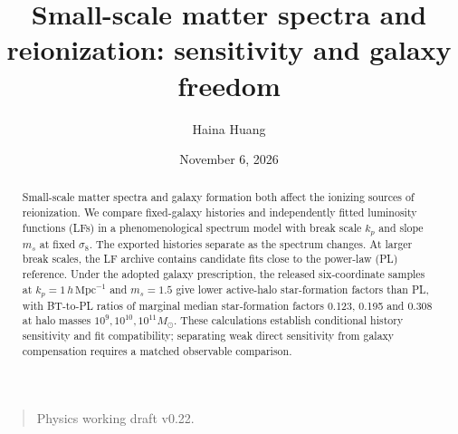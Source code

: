 \documentclass[reprint,superscriptaddress,nofootinbib,nobibnotes,amsmath,amssymb,aps,prd,floatfix,longbibliography]{revtex4-2}
\def\btemubody{body.tex}
\begin{document}
\title{Small-scale matter spectra and reionization: sensitivity and galaxy freedom}
\author{Haina Huang}
\date{November 6, 2026}
\begin{abstract}
Small-scale matter spectra and galaxy formation both affect the ionizing sources of reionization. We compare fixed-galaxy histories and independently fitted luminosity functions (LFs) in a phenomenological spectrum model with break scale $k_p$ and slope $m_s$ at fixed $\sigma_8$. The exported histories separate as the spectrum changes. At larger break scales, the LF archive contains candidate fits close to the power-law (PL) reference. Under the adopted galaxy prescription, the released six-coordinate samples at $k_p=1\,h\,\mathrm{Mpc}^{-1}$ and $m_s=1.5$ give lower active-halo star-formation factors than PL, with BT-to-PL ratios of marginal median star-formation factors 0.123, 0.195 and 0.308 at halo masses $10^9,10^{10},10^{11}M_\odot$. These calculations establish conditional history sensitivity and fit compatibility; separating weak direct sensitivity from galaxy compensation requires a matched observable comparison.
\end{abstract}
\maketitle
\begin{quote}\small Physics working draft v0.22.\end{quote}

\end{document}
